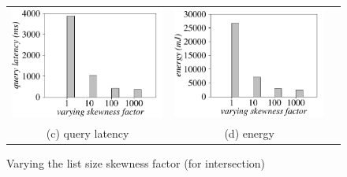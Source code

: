 \begin{figure}[htbp]
\begin{tabular}{ccc}
  \includegraphics[width=0.5\columnwidth]{figures/Intersection-time-VaryListSkew1-eps-converted-to.pdf}&
  \includegraphics[width=0.5\columnwidth]{figures/Intersection-energy-VaryListSkew1-eps-converted-to.pdf}\\
  (c) query latency & (d) energy\\
\end{tabular}

  \caption{Varying the list size skewness factor (for intersection)}
  \label{fig:varyListSkewIntersection}
 \end{figure}


